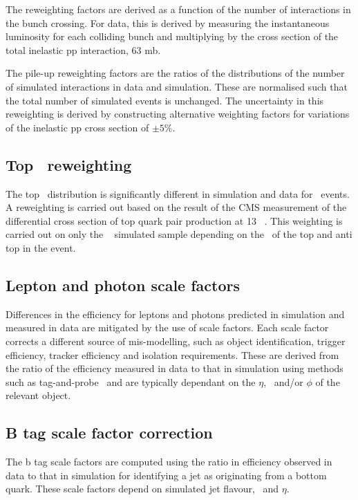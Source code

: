 The reweighting factors are derived as a function of the number 
of interactions in the bunch crossing. For data, this is derived by measuring the instantaneous luminosity
for each colliding bunch and multiplying by the cross section 
of the total inelastic pp interaction, 63 mb. 

The pile-up reweighting factors are the ratios of the distributions of the number
of simulated interactions in data and simulation. These are normalised such that the 
total number of simulated events is unchanged. The uncertainty in this reweighting is derived by 
constructing alternative weighting factors for variations 
of the inelastic pp cross section of $\pm5\%$.

\subsection{Top \pt~reweighting}

The top \pt~distribution is significantly different in simulation and data for 
\ttbar~events. A reweighting is carried out based on the result of the CMS 
measurement of the differential cross section of top quark pair production 
at 13 \TeV~\cite{toppt}. This weighting is carried out on only the \ttbar~ 
simulated sample depending on the \pt~of the top and anti top in the event.

\subsection{Lepton and photon scale factors}
\label{sec:scale-factor}
Differences in the efficiency for leptons and photons predicted in 
simulation and measured in data are mitigated by the use of scale factors. 
Each scale factor corrects a different source of mis-modelling, such as 
object identification, trigger efficiency, tracker efficiency and isolation requirements.
These are derived from the ratio of the efficiency measured in data to that
in simulation using methods such as tag-and-probe~\cite{MuonReco} 
and are typically dependant on the $\eta$, \pt~and/or $\phi$ of the relevant object.

\subsection{B tag scale factor correction}

The b tag scale factors are computed using the ratio in efficiency observed in data
to that in simulation for identifying a jet as originating from a bottom
quark. These scale factors depend on simulated jet flavour, \pt~and $\eta$. 

